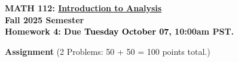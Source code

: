 \documentclass[11pt]{article}
\numberwithin{equation}{section}
\DeclareMathOperator*{\+}{\oplus}
\begin{document}
\hypersetup{linkcolor=black}

\begin{center} 
\textbf{{MATH 112: \underline{Introduction to Analysis}}}\\
\textbf{{Fall 2025 Semester}}\\
\textbf{{Homework \textcolor{black}{4}: Due \textcolor{black}{Tuesday} \textcolor{black}{October} \textcolor{black}{07}, 10:00am PST.}}\\
 \end{center}

 \noindent \textbf{Assignment} (2 Problems: 50 + 50 = 100 points total.)\medskip 
 
\end{document}
